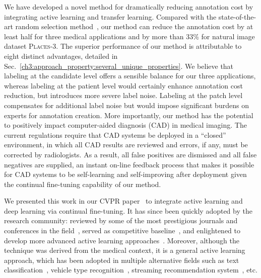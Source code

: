 We have developed a novel method for dramatically reducing annotation cost by integrating active learning and transfer learning. Compared with the state-of-the-art random selection method~\citep{tajbakhsh2016convolutional}, our method can reduce the annotation cost by at least half for three medical applications and by more than 33\% for natural image dataset \textsc{Places-3}. The superior performance of our method is attributable to eight distinct advantages, detailed in Sec.~\ref{ch3:approach_property:several_unique_properties}. We believe that labeling at the candidate level offers a sensible balance for our three applications, whereas labeling at the patient level would certainly enhance annotation cost reduction, but introduces more severe label noise. Labeling at the patch level compensates for additional label noise but would impose significant burdens on experts for annotation creation. More importantly, our method has the potential to positively impact computer-aided diagnosis (CAD) in medical imaging. The current regulations require that CAD systems be deployed in a ``closed'' environment, in which all CAD results are reviewed and errors, if any, must be corrected by radiologists. As a result, all false positives are dismissed and all false negatives are supplied, an instant on-line feedback process that makes it possible for CAD systems to be self-learning and self-improving after deployment given the continual fine-tuning capability of our method.

We presented this work in our CVPR paper~\citep{zhou2017fine} to integrate active learning and deep learning via continual fine-tuning. It has since been quickly adopted by the research community: reviewed by some of the most prestigious journals and conferences in the field~\citep{wang2018uncertainty,zhang2019attention,sourati2019intelligent,liu2019exploiting,bi2019active,zhang2019medical,budd2019survey}, served as competitive baseline~\citep{shi2019active,duan2019improved}, and enlightened to develop more advanced active learning approaches~\citep{zhou2019integrating,li2019reverse,zhang2019using}. Moreover, although the technique was derived from the medical context, it is a general active learning approach, which has been adopted in multiple alternative fields such as text classification~\citep{oftedal2019uncertainty}, vehicle type recognition~\citep{huang2019cost}, streaming recommendation system~\citep{guo2019streaming}, etc.




